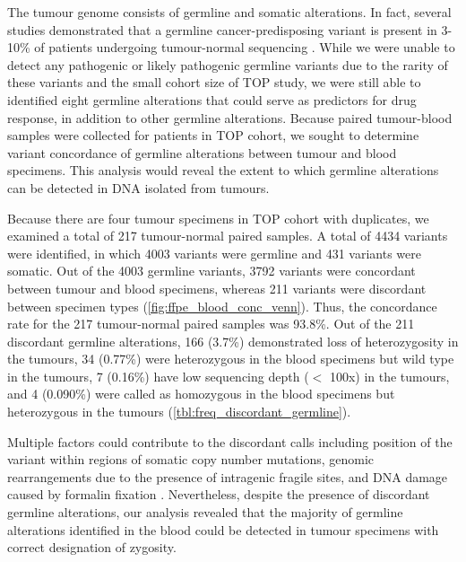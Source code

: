 The tumour genome consists of germline and somatic alterations. In fact, several studies demonstrated that a germline cancer-predisposing variant is present in 3-10\% of patients undergoing tumour-normal sequencing \cite{Raymond2016, Meric-Bernstam2016, Schrader2015, Jones2015a}. While we were unable to detect any pathogenic or likely pathogenic germline variants due to the rarity of these variants and the small cohort size of TOP study, we were still able to identified eight germline alterations that could serve as predictors for drug response, in addition to other germline alterations. Because paired tumour-blood samples were collected for patients in TOP cohort, we sought to determine variant concordance of germline alterations between tumour and blood specimens. This analysis would reveal the extent to which germline alterations can be detected in DNA isolated from tumours.

Because there are four tumour specimens in TOP cohort with duplicates, we examined a total of 217 tumour-normal paired samples. A total of 4434 variants were identified, in which 4003 variants were germline and 431 variants were somatic. Out of the 4003 germline variants, 3792 variants were concordant between tumour and blood specimens, whereas 211 variants were discordant between specimen types (\autoref{fig:ffpe_blood_conc_venn}). Thus, the concordance rate for the 217 tumour-normal paired samples was 93.8\%. Out of the 211 discordant germline alterations, 166 (3.7\%) demonstrated loss of heterozygosity in the tumours, 34 (0.77\%) were heterozygous in the blood specimens but wild type in the tumours, 7 (0.16\%) have low sequencing depth ($<$ 100x) in the tumours, and 4 (0.090\%) were called as homozygous in the blood specimens but heterozygous in the tumours (\autoref{tbl:freq_discordant_germline}).

Multiple factors could contribute to the discordant calls including position of the variant within regions of somatic copy number mutations, genomic rearrangements due to the presence of intragenic fragile sites, and DNA damage caused by formalin fixation \cite{}. Nevertheless, despite the presence of discordant germline alterations, our analysis revealed that the majority of germline alterations identified in the blood could be detected in tumour specimens with correct designation of zygosity.


